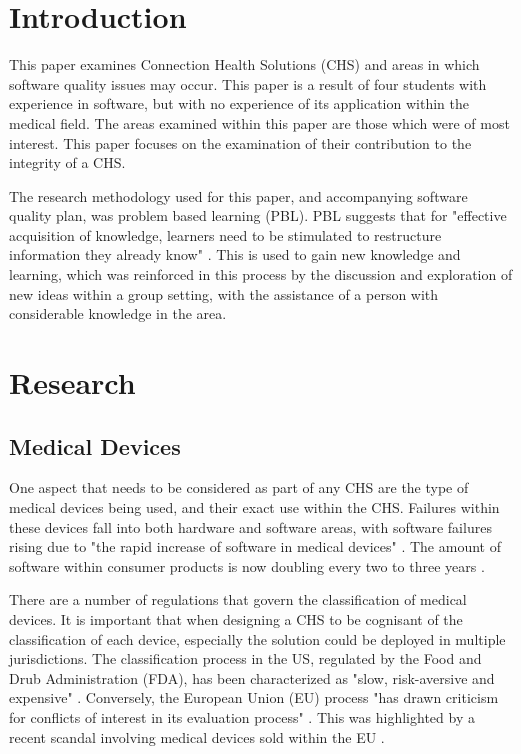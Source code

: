 \section{Introduction}

This paper examines Connection Health Solutions (CHS) and areas in which software quality issues may occur. This paper is a result of four students with experience in software, but with no experience of its application within the medical field. The areas examined within this paper are those which were of most interest. This paper focuses on the examination of their contribution to the integrity of a CHS.

The research methodology used for this paper, and accompanying software quality plan, was problem based learning (PBL). PBL suggests that for "effective acquisition of knowledge, learners need to be stimulated to restructure information they already know" \parencite{pbl}. This is used to gain new knowledge and learning, which was reinforced in this process by the discussion and exploration of new ideas within a group setting, with the assistance of a person with considerable knowledge in the area. 

\section{Research}

\subsection{Medical Devices}

One aspect that needs to be considered as part of any CHS are the type of medical devices being used, and their exact use within the CHS. Failures within these devices fall into both hardware and software areas, with software failures rising due to "the rapid increase of software in medical devices" \parencite{mdfail}. The amount of software within consumer products is now doubling every two to three years \parencite{gibbs1994software}. 

There are a number of regulations that govern the classification of medical devices. It is important that when designing a CHS to be cognisant of the classification of each device, especially the solution could be deployed in multiple jurisdictions. The classification process in the US, regulated by the Food and Drub Administration (FDA), has been characterized as "slow, risk-aversive and expensive" \parencite{regulation}. Conversely, the European Union (EU) process "has drawn criticism for conflicts of interest in its evaluation process" \parencite{regulation}. This was highlighted by a recent scandal involving medical devices sold within the EU \parencite{eumedicaldevice}.

